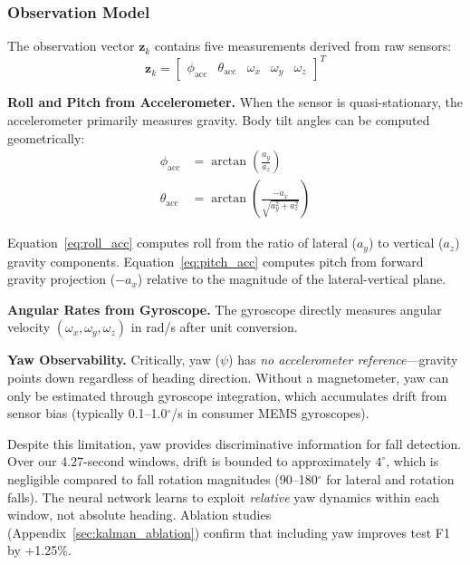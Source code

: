 \subsubsection{Observation Model}

The observation vector $\mathbf{z}_k$ contains five measurements derived from raw sensors:
\begin{equation}
\mathbf{z}_k = \begin{bmatrix} \phi_{\text{acc}} & \theta_{\text{acc}} & \omega_x & \omega_y & \omega_z \end{bmatrix}^T
\label{eq:measurement_vector}
\end{equation}

\textbf{Roll and Pitch from Accelerometer.} When the sensor is quasi-stationary, the accelerometer primarily measures gravity. Body tilt angles can be computed geometrically:
\begin{align}
\phi_{\text{acc}} &= \arctan\left(\frac{a_y}{a_z}\right) \label{eq:roll_acc} \\
\theta_{\text{acc}} &= \arctan\left(\frac{-a_x}{\sqrt{a_y^2 + a_z^2}}\right) \label{eq:pitch_acc}
\end{align}

Equation~\ref{eq:roll_acc} computes roll from the ratio of lateral ($a_y$) to vertical ($a_z$) gravity components. Equation~\ref{eq:pitch_acc} computes pitch from forward gravity projection ($-a_x$) relative to the magnitude of the lateral-vertical plane.

\textbf{Angular Rates from Gyroscope.} The gyroscope directly measures angular velocity $(\omega_x, \omega_y, \omega_z)$ in rad/s after unit conversion.

\textbf{Yaw Observability.} Critically, yaw ($\psi$) has \textit{no accelerometer reference}---gravity points down regardless of heading direction. Without a magnetometer, yaw can only be estimated through gyroscope integration, which accumulates drift from sensor bias (typically 0.1--1.0$^\circ$/s in consumer MEMS gyroscopes).

Despite this limitation, yaw provides discriminative information for fall detection. Over our 4.27-second windows, drift is bounded to approximately $4^\circ$, which is negligible compared to fall rotation magnitudes (90--180$^\circ$ for lateral and rotation falls). The neural network learns to exploit \textit{relative} yaw dynamics within each window, not absolute heading. Ablation studies (Appendix~\ref{sec:kalman_ablation}) confirm that including yaw improves test F1 by +1.25\%.


